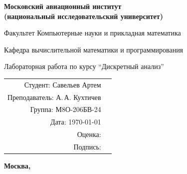 \begin{titlepage}
\begin{center}
\bfseries
{\Large Московский авиационный институт\\ (национальный исследовательский университет)}

\vspace{48pt}
{\large Факультет Компьютерные науки и прикладная математика}

\vspace{36pt}
{\large Кафедра вычислительной математики и программирования}

\vspace{48pt}
Лабораторная работа  по курсу \enquote{Дискретный анализ}
\end{center}

\vspace{72pt}
\begin{flushright}
\begin{tabular}{rl}
Студент: Савельев Артем \\
Преподаватель: А.\,А. Кухтичев& \\
Группа: М8О-206БВ-24& \\
Дата: \today& \\
Оценка: & \\
Подпись: & \\
\end{tabular}
\end{flushright}

\vfill
\begin{center}
\bfseries
Москва, \the\year
\end{center}
\end{titlepage}
\pagebreak
